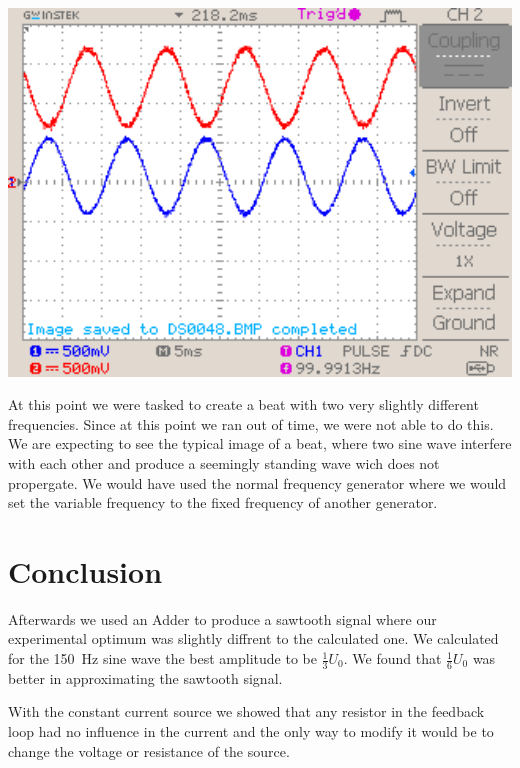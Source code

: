 \documentclass[a4paper,10pt]{article}
\newenvironment{Figure}
        {\par\medskip\noindent\minipage{\linewidth}}
        {\endminipage\par\medskip}
\numberwithin{equation}{section}
\begin{document}
\begin{multicols}{2}
\begin{Figure}
		\label{fig:damp2}
	\end{Figure}
	\begin{Figure}
		\centering
		\includegraphics[width=1\textwidth]{../data/DS0049_n.png}
		\label{fig:damp3}
	\end{Figure}

  At this point we were tasked to create a beat with two very slightly different frequencies. Since at this point we ran out of time, we were not able to do this. We are expecting to see the typical image of a beat, where two sine wave interfere with each other and produce a seemingly standing wave wich does not propergate. We would have used the normal frequency generator where we would set the variable frequency to the fixed frequency of another generator.
  \section{Conclusion}
  

  Afterwards we used an Adder to produce a sawtooth signal where our experimental optimum was slightly diffrent to the calculated one. We calculated for the \SI{150}{Hz} sine wave the best amplitude to be $\frac{1}{3}U_0$. We found that $\frac{1}{6}U_0$ was better in approximating the sawtooth signal.

  With the constant current source we showed that any resistor in the feedback loop had no influence in the current and the only way to modify it would be to change the voltage or resistance of the source.


\end{multicols}
\end{document}
